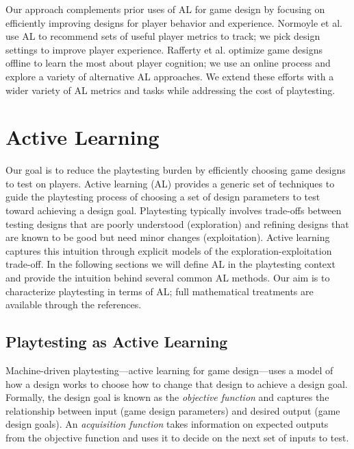 \documentclass{sig-alternate}
\begin{document}
Our approach complements prior uses of AL for game design by focusing on efficiently improving designs for player behavior and experience.
Normoyle et al. \cite{normoyle2012:al-metrics} use AL to recommend sets of useful player metrics to track; we pick design settings to improve player experience.
Rafferty et al. \cite{rafferty2012:opt-cog-game} optimize game designs offline to learn the most about player cognition; we use an online process and explore a variety of alternative AL approaches.
We extend these efforts with a wider variety of AL metrics and tasks while addressing the cost of playtesting.



\section{Active Learning}

Our goal is to reduce the playtesting burden by efficiently choosing game designs to test on players.
Active learning (AL) provides a generic set of techniques to guide the playtesting process of choosing a set of design parameters to test toward achieving a design goal.
Playtesting typically involves trade-offs between testing designs that are poorly understood (exploration) and refining designs that are known to be good but need minor changes (exploitation).
Active learning captures this intuition through explicit models of the exploration-exploitation trade-off.
In the following sections we will define AL in the playtesting context and provide the intuition behind several common AL methods.
Our aim is to characterize playtesting in terms of AL; full mathematical treatments are available through the references.


\subsection{Playtesting as Active Learning}
Machine-driven playtesting---active learning for game design---uses a model of how a design works to choose how to change that design to achieve a design goal.
Formally, the design goal is known as the \textit{objective function} and captures the relationship between input (game design parameters) and desired output (game design goals).
An \textit{acquisition function} takes information on expected outputs from the objective function and uses it to decide on the next set of inputs to test.
\end{document}
